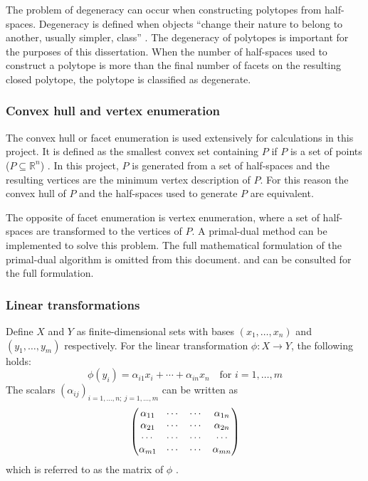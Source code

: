 The problem of degeneracy can occur when constructing polytopes from half-spaces.
Degeneracy is defined when objects ``change their nature to belong to another, usually simpler, class'' \citep[688]{crcmaths}.
The degeneracy of polytopes is important for the purposes of this dissertation.
When the number of half-spaces used to construct a polytope is more than the final number of facets on the resulting closed polytope, the polytope is classified as degenerate.

\subsubsection{Convex hull and vertex enumeration}
The convex hull or facet enumeration is used extensively for calculations in this project.
It is defined as the smallest convex set containing $P$ if $P$ is a set of points ($P \subseteq \mathbb{R}^n$) \citep[74]{wenger}.
In this project, $P$ is generated from a set of half-spaces and the resulting vertices are the minimum vertex description of $P$.
For this reason the convex hull of $P$ and the half-spaces used to generate $P$ are equivalent.

The opposite of facet enumeration is vertex enumeration, where a set of half-spaces are transformed to the vertices of $P$.
A primal-dual method can be implemented to solve this problem.
The full mathematical formulation of the primal-dual algorithm is omitted from this document.
\citet[636-639]{primaldual1} and \citet{primaldual2} can be consulted for the full formulation. 

\subsubsection{Linear transformations}
Define $X$ and $Y$ as finite-dimensional sets with bases $(x_1,\dots,x_n)$ and $(y_1,\dots,y_m)$ respectively.
For the linear transformation $\phi : X \to Y$, the following holds:
\begin{equation}
  \label{eq:lintrans}
  \phi(y_i) = \alpha_{i1}x_i+\cdots+\alpha_{in}x_n \text{~~~for~} i = 1, \dots, m
\end{equation}
The scalars $(\alpha_{ij})_{i=1,\dots,n;~j=1,\dots,m}$ can be written as
\begin{equation}
  \begin{pmatrix}
    \alpha_{11} &\cdots &\cdots &\alpha_{1n} \\
    \alpha_{21} &\cdots &\cdots &\alpha_{2n} \\
    \cdots     &\cdots &\cdots &\cdots \\
    \alpha_{m1} &\cdots &\cdots &\alpha_{mn} \\
  \end{pmatrix} \notag
\end{equation}
which is referred to as the matrix of $\phi$ \citep[48-49,~166]{leung}.

